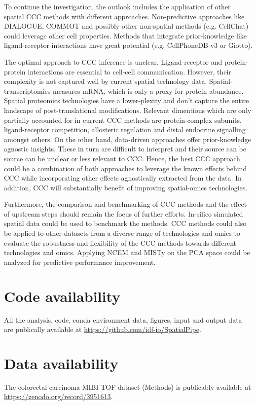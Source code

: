 To continue the investigation, the outlook includes the application of other spatial CCC methods with different approaches. Non-predictive approaches like DIALOGUE, COMMOT and possibly other non-spatial methods (e.g. CellChat) could leverage other cell properties. Methods that integrate prior-knowledge like ligand-receptor interactions have great potential (e.g. CellPhoneDB v3 or Giotto).

The optimal approach to CCC inference is unclear. Ligand-receptor and protein-protein interactions are essential to cell-cell communication. However, their complexity is not captured well by current spatial technology data. Spatial-transcriptomics measures mRNA, which is only a proxy for protein abundance. Spatial proteomics technologies have a lower-plexity and don't capture the entire landscape of post-translational modifications. Relevant dimentions which are only partially accounted for in current CCC methods are protein-complex subunits, ligand-receptor competition, allosteric regulation and distal endocrine signalling amongst others. On the other hand, data-driven approaches offer prior-knowledge agnostic insights. These in turn are difficult to interpret and their source can be source  can be unclear or less relevant to CCC. Hence, the best CCC approach could be a combination of both approaches to leverage the known effects behind CCC while incorporating other effects agnostically extracted from the data. In addition, CCC will substantially benefit of improving spatial-omics technologies.

Furthermore, the comparison and benchmarking of CCC methods and the effect of upstream steps should remain the focus of further efforts. In-silico simulated spatial data could be used to benchmark the methods. CCC methods could also be applied to other datasets from a diverse range of technologies and omics to evaluate the robustness and flexibility of the CCC methods towards different technologies and omics. Applying NCEM and MISTy on the PCA space could be analyzed for predictive performance improvement. 



\section*{Code availability}

All the analysis, code, conda environment data, figures, input and output data are publically available at \url{https://github.com/idf-io/SpatialPipe}.



\section*{Data availability}

The colorectal carcinoma MIBI-TOF dataset (Methods) is publicably available at \url{https://zenodo.org/record/3951613}.
